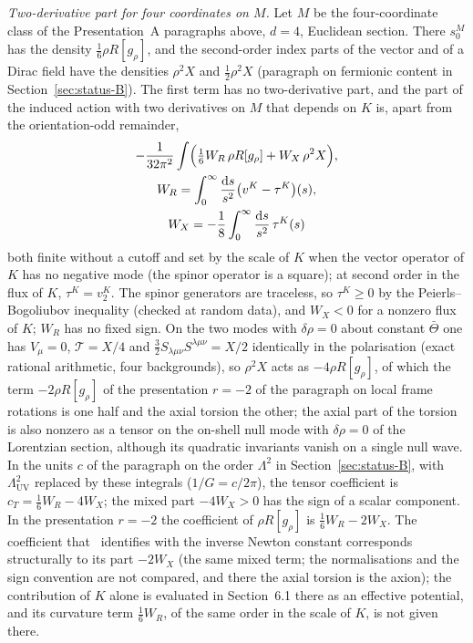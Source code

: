 \emph{Two-derivative part for four coordinates on \(M\).} Let \(M\) be the four-coordinate class of the Presentation~A paragraphs above, \(d=4\), Euclidean section. There \(s_0^M\) has the density \(\tfrac16\rho R[g_\rho]\), and the second-order index parts of the vector and of a Dirac field have the densities \(\rho^2X\) and \(\tfrac12\rho^2X\) (paragraph on fermionic content in Section~\ref{sec:status-B}). The first term has no two-derivative part, and the part of the induced action with two derivatives on \(M\) that depends on \(K\) is, apart from the orientation-odd remainder,
\begin{multline*}
  -\frac1{32\pi^2}\int\Bigl(\tfrac16W_R\,\rho R[g_\rho]+W_X\,\rho^2X\Bigr), \\
  W_R=\int_0^\infty\frac{\mathrm ds}{s^2}\bigl(v^K-\tau^K\bigr)(s), \\
  W_X=-\frac18\int_0^\infty\frac{\mathrm ds}{s^2}\,\tau^K(s)
\end{multline*}
both finite without a cutoff and set by the scale of \(K\) when the vector operator of \(K\) has no negative mode (the spinor operator is a square); at second order in the flux of \(K\), \(\tau^K=v_2^K\). The spinor generators are traceless, so \(\tau^K\ge0\) by the Peierls--Bogoliubov inequality (checked at random data), and \(W_X<0\) for a nonzero flux of \(K\); \(W_R\) has no fixed sign. On the two modes with \(\delta\rho=0\) about constant \(\bar\Theta\) one has \(V_\mu=0\), \(\mathcal T=X/4\) and \(\tfrac32S_{\lambda\mu\nu}S^{\lambda\mu\nu}=X/2\) identically in the polarisation (exact rational arithmetic, four backgrounds), so \(\rho^2X\) acts as \(-4\rho R[g_\rho]\), of which the term \(-2\rho R[g_\rho]\) of the presentation \(r=-2\) of the paragraph on local frame rotations is one half and the axial torsion the other; the axial part of the torsion is also nonzero as a tensor on the on-shell null mode with \(\delta\rho=0\) of the Lorentzian section, although its quadratic invariants vanish on a single null wave. In the units \(c\) of the paragraph on the order \(\Lambda^2\) in Section~\ref{sec:status-B}, with \(\Lambda_{\mathrm{UV}}^2\) replaced by these integrals (\(1/G=c/2\pi\)), the tensor coefficient is \(c_T=\tfrac16W_R-4W_X\); the mixed part \(-4W_X>0\) has the sign of a scalar component. In the presentation \(r=-2\) the coefficient of \(\rho R[g_\rho]\) is \(\tfrac16W_R-2W_X\). The coefficient that~\cite{Steinacker2023} identifies with the inverse Newton constant corresponds structurally to its part \(-2W_X\) (the same mixed term; the normalisations and the sign convention are not compared, and there the axial torsion is the axion); the contribution of \(K\) alone is evaluated in Section~6.1 there as an effective potential, and its curvature term \(\tfrac16W_R\), of the same order in the scale of \(K\), is not given there.

